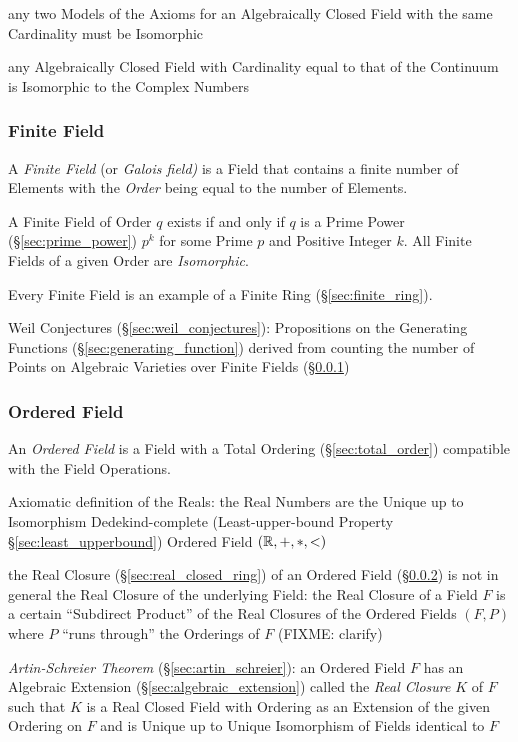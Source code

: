 any two Models of the Axioms for an Algebraically Closed Field with the same
Cardinality must be Isomorphic

any Algebraically Closed Field with Cardinality equal to that of the Continuum
is Isomorphic to the Complex Numbers



\subsubsection{Finite Field}\label{sec:finite_field}

A \emph{Finite Field} (or \emph{Galois field)} is a Field that contains a
finite number of Elements with the \emph{Order} being equal to the number of
Elements.

A Finite Field of Order $q$ exists if and only if $q$ is a Prime Power
(\S\ref{sec:prime_power}) $p^k$ for some Prime $p$ and Positive Integer $k$.
All Finite Fields of a given Order are \emph{Isomorphic}.

Every Finite Field is an example of a Finite Ring (\S\ref{sec:finite_ring}).

Weil Conjectures (\S\ref{sec:weil_conjectures}): Propositions on the Generating
Functions (\S\ref{sec:generating_function}) derived from counting the number of
Points on Algebraic Varieties over Finite Fields (\S\ref{sec:finite_field})



\subsubsection{Ordered Field}\label{sec:ordered_field}

An \emph{Ordered Field} is a Field with a Total Ordering
(\S\ref{sec:total_order}) compatible with the Field Operations.

Axiomatic definition of the Reals: the Real Numbers are the Unique up to
Isomorphism Dedekind-complete (Least-upper-bound Property
\S\ref{sec:least_upperbound}) Ordered Field $(\mathbb{R}, +, *, <)$

the Real Closure (\S\ref{sec:real_closed_ring}) of an Ordered Field
(\S\ref{sec:ordered_field}) is not in general the Real Closure of the
underlying Field: the Real Closure of a Field $F$ is a certain ``Subdirect
Product'' of the Real Closures of the Ordered Fields $(F,P)$ where $P$ ``runs
through'' the Orderings of $F$ (FIXME: clarify)

\emph{Artin-Schreier Theorem} (\S\ref{sec:artin_schreier}): an Ordered Field
$F$ has an Algebraic Extension (\S\ref{sec:algebraic_extension}) called the
\emph{Real Closure} $K$ of $F$ such that $K$ is a Real Closed Field with
Ordering as an Extension of the given Ordering on $F$ and is Unique up to
Unique Isomorphism of Fields identical to $F$

